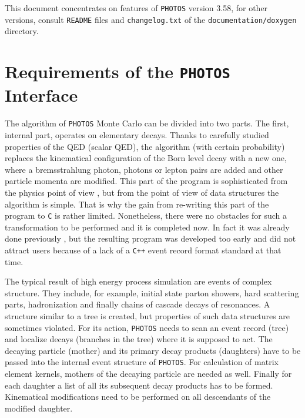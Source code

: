\documentclass[]{Photos_interface_design}
\begin{document}
This document concentrates on features of {\tt PHOTOS} version 3.58, for 
other versions, consult {\tt README} files and {\tt changelog.txt} of the {\tt documentation/doxygen} directory.

\section{Requirements of the {\tt PHOTOS} Interface}
\label{sec:requrements}
The algorithm of {\tt PHOTOS} Monte Carlo can be divided into two parts.
The first, internal part, operates on elementary decays. Thanks to carefully 
studied properties of the 
QED (scalar QED), the  algorithm (with certain probability) 
replaces the kinematical configuration of the Born level decay with a new one, 
where a bremsstrahlung photon, photons or lepton pairs
are added and other particle momenta are modified. This part of the program is sophisticated from the physics 
point of view \cite{Golonka:2006tw,Nanava:2006vv},
but from the point of view of data structures the algorithm is simple.
That is why the gain from re-writing this part of the program to {\tt C} is rather
limited. Nonetheless, there were no obstacles for such a transformation to be
performed and it is completed now. In fact it was already done
previously \cite{photosplus}, but the resulting program was developed too early 
and did not attract users because of a lack of a {\tt C++} event record format standard at that time.

The typical result of high energy process simulation are events of complex structure.
They include, for example, initial state parton showers, hard scattering parts,
hadronization and finally chains of cascade decays of resonances. 
A structure similar to a tree is created, but properties of such data structures
are sometimes violated.
For its action, {\tt PHOTOS} needs to scan an event record (tree) 
and localize decays (branches in the tree) where
it is supposed to act. The decaying particle (mother) and its primary decay products
(daughters) have to be passed into the internal event structure of {\tt PHOTOS}.
For calculation of matrix element kernels, mothers of the decaying particle are needed as well. 
Finally for each daughter a list of all its subsequent decay products has to be 
formed. Kinematical modifications need to be performed on all descendants of the modified daughter.
\end{document}
